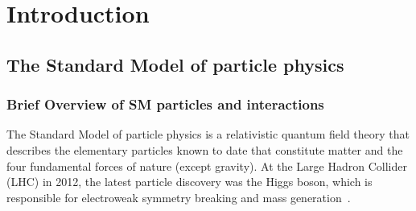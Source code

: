 \chapter{Introduction}
\section{The Standard Model of particle physics}
\subsection{Brief Overview of SM particles and interactions} \label{subsec:brief}

The Standard Model of particle physics is a relativistic quantum field theory that describes the elementary particles known to date that constitute matter and the four fundamental forces of nature (except gravity). At the Large Hadron Collider (LHC) in 2012, the latest particle discovery was the Higgs boson, which is responsible for electroweak symmetry breaking and mass generation~\cite{ATLAS:2023oaq}.